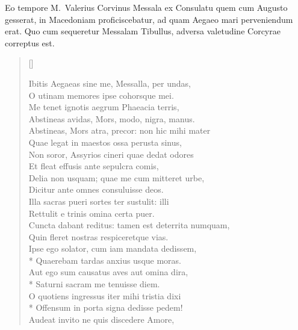 
Eo tempore M.\ Valerius Corvinus Messala ex Consulatu quem cum Augusto gesserat, in Macedoniam proficiscebatur, ad quam Aegaeo mari perveniendum erat. Quo cum sequeretur Messalam Tibullus, adversa valetudine Corcyrae correptus est.







\settowidth{\versewidth}{Cuncta dabant reditus: tamen est deterrita numquam,}
\begin{verse}[\versewidth]
\begin{altverse}
{\large
Ibitis Aegaeas sine me, Messalla, per undas,\\
O utinam memores ipse cohorsque mei.\\
Me tenet ignotis aegrum Phaeacia terris,\\
Abstineas avidas, Mors, modo, nigra, manus.\\
Abstineas, Mors atra, precor: non hic mihi mater\\
Quae legat in maestos ossa perusta sinus,\\
Non soror, Assyrios cineri quae dedat odores\\
Et fleat effusis ante sepulcra comis,\\
Delia non usquam; quae me cum mitteret urbe,\\
Dicitur ante omnes consuluisse deos.\\
Illa sacras pueri sortes ter sustulit: illi\\
Rettulit e trinis omina certa puer.\\
Cuncta dabant reditus: tamen est deterrita numquam,\\
Quin fleret nostras respiceretque vias.\\
Ipse ego solator, cum iam mandata dedissem,\\*
Quaerebam tardas anxius usque moras.\\
Aut ego sum causatus aves aut omina dira,\\*
Saturni sacram me tenuisse diem.\\
O quotiens ingressus iter mihi tristia dixi\\*
Offensum in porta signa dedisse pedem!\\
Audeat invito ne quis discedere Amore,\\
}
\end{altverse}
\end{verse}
